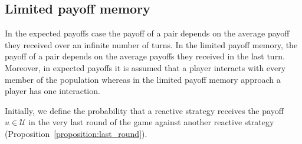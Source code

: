 \documentclass[11pt]{article}
\theoremstyle{plainCl1}
\theoremstyle{plainCl2}
\begin{document}
\subsection{Limited payoff memory}\label{section:limited_memory}

In the expected payoffs case the payoff of a pair depends on the average payoff
they received over an infinite number of turns. In the limited payoff memory,
the payoff of a pair depends on the average payoffs they received in the last
turn. Moreover, in expected payoffs it is assumed that a player interacts with
every member of the population whereas in the limited payoff memory approach a
player has one interaction.

Initially, we define the probability that a reactive strategy receives the
payoff $u\!\in\! \mathcal{U}$ in the very last round of the game against another
reactive strategy (Proposition~\ref{proposition:last_round}).
\end{document}
